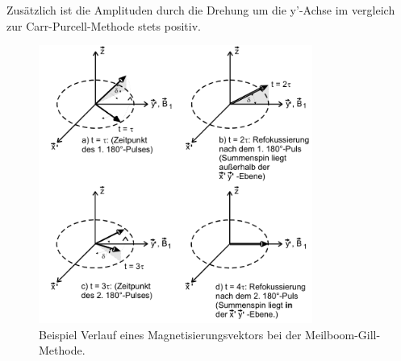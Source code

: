 \begin{itemize}
Zusätzlich ist die Amplituden durch die Drehung
um die y'-Achse im vergleich zur Carr-Purcell-Methode stets positiv.
\begin{figure}
  \includegraphics[width=0.8\textwidth]{mei-gil.PNG}
  \caption{Beispiel Verlauf eines Magnetisierungsvektors bei
  der Meilboom-Gill-Methode.\cite{sample}}
  \label{fig:mei-gil}
\end{figure}
\end{itemize}

